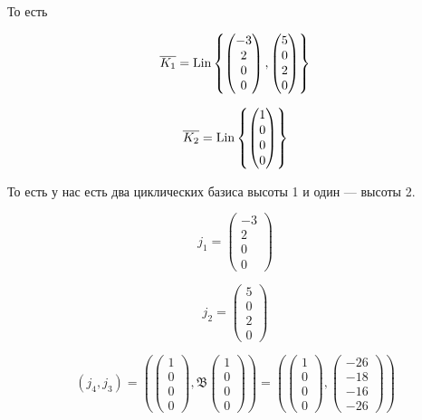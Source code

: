 \documentclass[12pt, a4paper]{article}
\begin{document}
    То есть

    \begin{equation}
        \overline{K_1} = \operatorname{Lin} \left\{ \begin{pmatrix} -3\\2\\0\\0 \end{pmatrix}, \begin{pmatrix} 5\\0\\2\\0 \end{pmatrix} \right\}
    \end{equation}

    \begin{equation}
        \overline{K_2} = \operatorname{Lin} \left\{ \begin{pmatrix} 1\\0\\0\\0 \end{pmatrix} \right\}
    \end{equation}

    То есть у нас есть два циклических базиса высоты 1 и один — высоты 2.

    \begin{equation}
        j_1 = \begin{pmatrix} -3\\2\\0\\0 \end{pmatrix}
    \end{equation}

    \begin{equation}
        j_2 = \begin{pmatrix} 5\\0\\2\\0 \end{pmatrix}
    \end{equation}

    \begin{equation}
        (j_4, j_3) = \left( \begin{pmatrix} 1\\0\\0\\0 \end{pmatrix}, \mathfrak{B}\begin{pmatrix} 1\\0\\0\\0 \end{pmatrix} \right)  =\left( \begin{pmatrix} 1\\0\\0\\0 \end{pmatrix}, \left(\begin{matrix}-26 \\-18 \\-16 \\-26\end{matrix}\right) \right)
    \end{equation}
\end{document}
